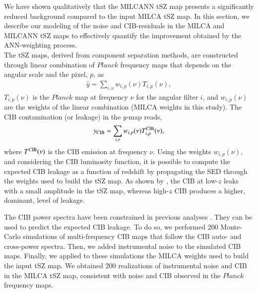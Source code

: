 \documentclass[traditabstract,a4,twocolumn]{aa}
\begin{document}
 We have shown qualitatively that the MILCANN tSZ map
  presents a significantly reduced background compared to the input MILCA tSZ
  map. In this section, we describe our modeling of the noise and
  CIB-residuals in the MILCA and MILCANN tSZ maps to effectively quantify the
  improvement obtained by the ANN-weighting process.\\

The tSZ maps, derived from component separation methods, are
constructed through linear combination of $Planck$ frequency maps
that depends on the angular scale and the pixel, $p$, as
\begin{align}
\widehat{y} = \sum_{i,\nu} w_{i,p}(\nu) T_{i,p}(\nu),
\end{align}
$T_{i,p}(\nu)$ is the {\it $Planck$} map at frequency $\nu$ for the
angular filter $i$, and $w_{i,p}(\nu)$ are the
weights of the linear combination (MILCA weights in this study).  The CIB contamination (or leakage) in the
$y$-map reads,
\begin{align}
y_{\rm CIB} = \sum_{i,\nu} w_{i,p}(\nu) T^{\rm CIB}_{i,p}(\nu),
\end{align}
where $T^{\rm CIB}(\nu)$ is the CIB emission at frequency $\nu$.
Using the weights $w_{i,p}(\nu)$, and considering the CIB luminosity
function, it is possible to compute the expected CIB leakage as a
function of redshift by propagating the SED through
the weights used to build the tSZ map.  As shown by
\citet{planckszcib}, the CIB at low-$z$ leaks with a small amplitude
in the tSZ map, whereas high-$z$ CIB produces a higher, dominant,
level of leakage. 

The CIB power spectra have been constrained in previous
analyses \citep[see e.g.,][]{planckcib}. They can be used to predict
the expected CIB leakage. To do so, we
performed 200 Monte-Carlo simulations of multi-frequency CIB maps that follow the CIB auto- and cross-power spectra. Then, we added instrumental noise to the simulated CIB maps.  Finally, we
applied  to these simulations the MILCA weights used to build the input tSZ map. We
obtained 200 realizations of instrumental noise and CIB in the MILCA tSZ map, consistent with noise and CIB observed in
the $Planck$ frequency maps.
\end{document}
